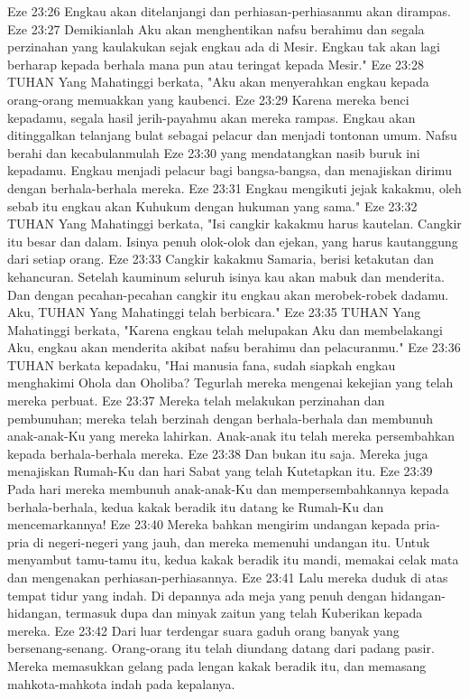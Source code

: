 Eze 23:26  Engkau akan ditelanjangi dan perhiasan-perhiasanmu akan dirampas.
Eze 23:27  Demikianlah Aku akan menghentikan nafsu berahimu dan segala perzinahan yang kaulakukan sejak engkau ada di Mesir. Engkau tak akan lagi berharap kepada berhala mana pun atau teringat kepada Mesir."
Eze 23:28  TUHAN Yang Mahatinggi berkata, "Aku akan menyerahkan engkau kepada orang-orang memuakkan yang kaubenci.
Eze 23:29  Karena mereka benci kepadamu, segala hasil jerih-payahmu akan mereka rampas. Engkau akan ditinggalkan telanjang bulat sebagai pelacur dan menjadi tontonan umum. Nafsu berahi dan kecabulanmulah
Eze 23:30  yang mendatangkan nasib buruk ini kepadamu. Engkau menjadi pelacur bagi bangsa-bangsa, dan menajiskan dirimu dengan berhala-berhala mereka.
Eze 23:31  Engkau mengikuti jejak kakakmu, oleh sebab itu engkau akan Kuhukum dengan hukuman yang sama."
Eze 23:32  TUHAN Yang Mahatinggi berkata, "Isi cangkir kakakmu harus kautelan. Cangkir itu besar dan dalam. Isinya penuh olok-olok dan ejekan, yang harus kautanggung dari setiap orang.
Eze 23:33  Cangkir kakakmu Samaria, berisi ketakutan dan kehancuran. Setelah kauminum seluruh isinya kau akan mabuk dan menderita. Dan dengan pecahan-pecahan cangkir itu engkau akan merobek-robek dadamu. Aku, TUHAN Yang Mahatinggi telah berbicara."
Eze 23:35  TUHAN Yang Mahatinggi berkata, "Karena engkau telah melupakan Aku dan membelakangi Aku, engkau akan menderita akibat nafsu berahimu dan pelacuranmu."
Eze 23:36  TUHAN berkata kepadaku, "Hai manusia fana, sudah siapkah engkau menghakimi Ohola dan Oholiba? Tegurlah mereka mengenai kekejian yang telah mereka perbuat.
Eze 23:37  Mereka telah melakukan perzinahan dan pembunuhan; mereka telah berzinah dengan berhala-berhala dan membunuh anak-anak-Ku yang mereka lahirkan. Anak-anak itu telah mereka persembahkan kepada berhala-berhala mereka.
Eze 23:38  Dan bukan itu saja. Mereka juga menajiskan Rumah-Ku dan hari Sabat yang telah Kutetapkan itu.
Eze 23:39  Pada hari mereka membunuh anak-anak-Ku dan mempersembahkannya kepada berhala-berhala, kedua kakak beradik itu datang ke Rumah-Ku dan mencemarkannya!
Eze 23:40  Mereka bahkan mengirim undangan kepada pria-pria di negeri-negeri yang jauh, dan mereka memenuhi undangan itu. Untuk menyambut tamu-tamu itu, kedua kakak beradik itu mandi, memakai celak mata dan mengenakan perhiasan-perhiasannya.
Eze 23:41  Lalu mereka duduk di atas tempat tidur yang indah. Di depannya ada meja yang penuh dengan hidangan-hidangan, termasuk dupa dan minyak zaitun yang telah Kuberikan kepada mereka.
Eze 23:42  Dari luar terdengar suara gaduh orang banyak yang bersenang-senang. Orang-orang itu telah diundang datang dari padang pasir. Mereka memasukkan gelang pada lengan kakak beradik itu, dan memasang mahkota-mahkota indah pada kepalanya.
